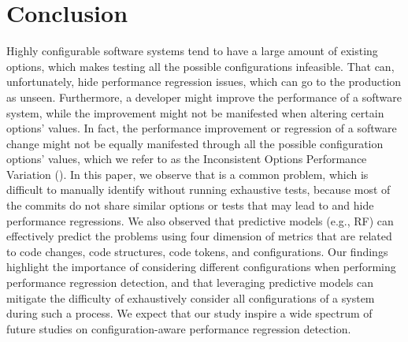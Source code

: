 
\section{Conclusion}
\label{sec:conclusion}

Highly configurable software systems tend to have a large amount of existing options, which makes testing all the possible configurations infeasible. That can, unfortunately, hide performance regression issues, which can go to the production as unseen. Furthermore, a developer might improve the performance of a software system, while the improvement might not be manifested when altering certain options' values. In fact, the performance improvement or regression of a software change might not be equally manifested through all the possible configuration options' values, which we refer to as the Inconsistent Options Performance Variation (\inconsistent). 
In this paper, %
we observe that \inconsistent is a common problem, which is difficult to manually identify without running exhaustive tests, because most of the commits do not share similar options or tests that may lead to \inconsistent and hide performance regressions.
We also observed that predictive models (e.g., RF) can effectively predict the \inconsistent problems using four dimension of metrics that are related to code changes, code structures, code tokens, and configurations. 
Our findings highlight the importance of considering different configurations when performing performance regression detection, and that leveraging predictive models can mitigate the difficulty of exhaustively consider all configurations of a system during such a process. 
We expect that our study inspire a wide spectrum of future studies on configuration-aware performance regression detection.


